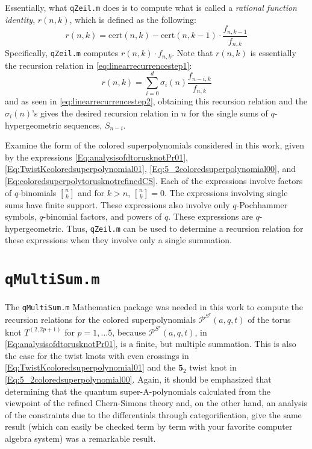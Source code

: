 \documentclass[a4paper,titlepage,twoside]{book}
\begin{document}
\begin{appendix}
Essentially, what \texttt{qZeil.m} does is to compute what is called a \emph{rational function identity}, $r(n,k)$, which is defined as the following:
\begin{equation}
  r{(n,k)} = \text{cert}{ (n,k)} - \text{cert}{( n,k-1)} \cdot \frac{ f_{n,k-1}}{ f_{n,k} }
\end{equation}
Specifically, \texttt{qZeil.m} computes $r{(n,k)} \cdot f_{n,k}$.  Note that $r{(n,k)}$ is essentially the recursion relation in \eqref{eq:linearrecurrencestep1}:
\[
r{(n,k)} = \sum_{i=0}^d \sigma_i{(n)}\frac{f_{n-i,k}}{ f_{n,k} }
\]
and as seen in \eqref{eq:linearrecurrencestep2}, obtaining this recursion relation and the $\sigma_i{(n)}$'s gives the desired recursion relation in $n$ for the single sums of $q$-hypergeometric sequences, $S_{n-i}$.  

Examine the form of the colored superpolynomials considered in this work, given by the expressions \eqref{Eq:analysisofdtorusknotPr01}, \eqref{Eq:TwistKcoloredsuperpolynomial01}, \eqref{Eq:5_2coloredsuperpolynomial00}, and \eqref{Eq:coloredsuperpolytorusknotrefinedCS}.  Each of the expressions involve factors of $q$-binomials ${ n \brack k}$ and for $k >n$, ${n \brack k} =0$.  The expressions involving single sums have finite support.  These expressions also involve only $q$-Pochhammer symbols, $q$-binomial factors, and powers of $q$.  These expressions are $q$-hypergeometric.  Thus, \texttt{qZeil.m} can be used to determine a recursion relation for these expressions when they involve only a single summation.  

\section{\texttt{qMultiSum.m}}

The \texttt{qMultiSum.m} Mathematica package was needed in this work to compute the recursion relations for the colored superpolynomials $\mathcal{P}^{S^r}{ (a,q,t) }$  of the torus knot $T^{(2,2p+1)}$ for $p=1 , \dots 5$, because $\mathcal{P}^{S^r}{ (a,q,t)}$, in \eqref{Eq:analysisofdtorusknotPr01}, is a finite, but multiple summation.  This is also the case for the twist knots with even crossings in \eqref{Eq:TwistKcoloredsuperpolynomial01} and the $\mathbf{5}_2$ twist knot in \eqref{Eq:5_2coloredsuperpolynomial00}.  Again, it should be emphasized that determining that the quantum super-A-polynomials calculated from the viewpoint of the refined Chern-Simons theory and, on the other hand, an analysis of the constraints due to the differentials through categorification, give the same result (which can easily be checked term by term with your favorite computer algebra system) was a remarkable result.


\end{appendix}
\end{document}
